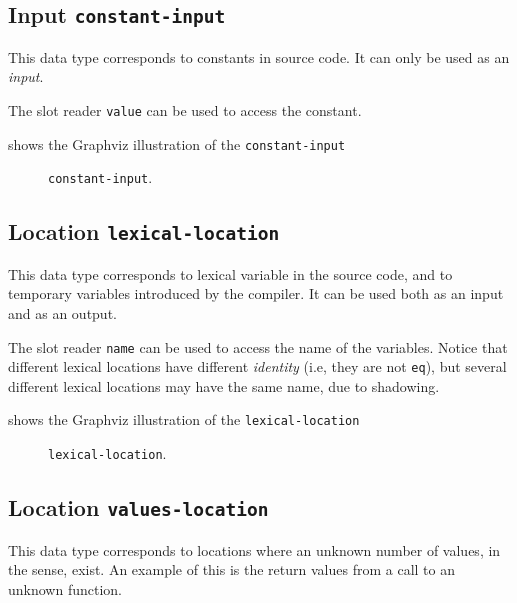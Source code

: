 \subsection{Input \texttt{constant-input}}

This data type corresponds to constants in source code.  It can only
be used as an \emph{input}.

The slot reader \texttt{value} can be used to access the constant. 

 shows the Graphviz illustration of the
\texttt{constant-input}

\begin{figure}
\begin{center}
\end{center}
\caption{\label{fig-constant-input}
\texttt{constant-input}.}
\end{figure}

\subsection{Location \texttt{lexical-location}}

This data type corresponds to lexical variable in the source code, and
to temporary variables introduced by the compiler.  It can be used
both as an input and as an output.

The slot reader \texttt{name} can be used to access the name of the
variables.  Notice that different lexical locations have different
\emph{identity} (i.e, they are not \texttt{eq}), but several different
lexical locations may have the same name, due to shadowing.

 shows the Graphviz illustration of the
\texttt{lexical-location}

\begin{figure}
\begin{center}
\end{center}
\caption{\label{fig-lexical-location}
\texttt{lexical-location}.}
\end{figure}

\subsection{Location \texttt{values-location}}

This data type corresponds to locations where an unknown number of
values, in the \commonlisp{} sense, exist. An example of this is
the return values from a call to an unknown function.

